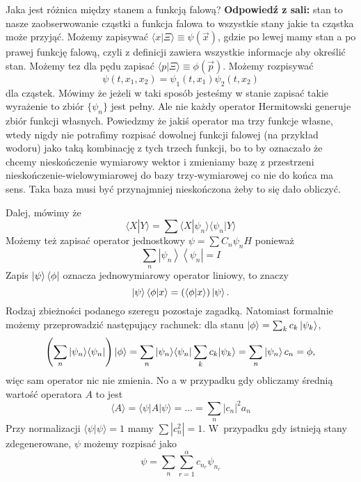 Jaka jest różnica między stanem a funkcją falową? \textbf{Odpowiedź z sali:} stan to nasze zaobserwowanie cząstki a funkcja falowa to wszystkie stany jakie ta cząstka może przyjąć. Możemy zapisywać $\langle x | \Xi \rangle \equiv \psi (\vec{x})$, gdzie po lewej mamy stan a po prawej funkcję falową, czyli z definicji zawiera wszystkie informacje aby określić stan. Możemy tez dla pędu zapisać $\langle p | \Xi \rangle \equiv \phi (\vec{p})$. Możemy rozpisywać $$ \psi(t, x_1, x_2) = \psi_1(t, x_1) \psi_2(t, x_2) $$ dla cząstek.
Mówimy że jeżeli w taki sposób jesteśmy w stanie zapisać takie wyrażenie to zbiór $\{\psi_n\}$ jest pełny. Ale nie każdy operator Hermitowski generuje zbiór funkcji własnych. Powiedzmy że jakiś operator ma trzy funkcje własne, wtedy nigdy nie potrafimy rozpisać dowolnej funkcji falowej (na przykład wodoru) jako taką kombinację z tych trzech funkcji, bo to by oznaczało że chcemy nieskończenie wymiarowy wektor i zmieniamy bazę z przestrzeni nieskończenie-wielowymiarowej do bazy trzy-wymiarowej co nie do końca ma sens. Taka baza musi być przynajmniej nieskończona żeby to się dało obliczyć.

Dalej, mówimy że 
\begin{equation*}
	\langle X | Y \rangle = \sum \langle X | \psi_n \rangle \langle \psi_n | Y \rangle
\end{equation*}
Możemy też zapisać operator jednostkowy $ \psi=\sum C_{n} \psi_{n} H $ ponieważ
\begin{equation*}
	\sum_{n}\left|\psi_{n}\right\rangle\left\langle\psi_{n}\right|=I 
\end{equation*}
Zapis $\ket{\psi}\bra{\phi}$ oznacza jednowymiarowy operator liniowy, to znaczy
\begin{equation*}
    \ket{\psi}\braket{\phi|x} = (\braket{\phi|x})\ket{\psi}.
\end{equation*}
Rodzaj zbieżności podanego szeregu pozostaje zagadką.
Natomiast formalnie możemy przeprowadzić następujący rachunek: dla
stanu $\ket{\phi} = \sum_k c_k \ket{\psi_k}$,
\begin{equation*}
    \left(\sum_{n} |\psi_{n} \rangle \langle \psi_{n} |\right) \ket{\phi} = 
	\sum_{n} |\psi_{n} \rangle \langle \psi_{n} | \sum_{k} c_{k} |\psi_{k} \rangle  =\sum_{n}\left|\psi_{n}\right\rangle c_{n}=\phi,
\end{equation*}
więc sam operator nic nie zmienia.
No a w przypadku gdy obliczamy średnią wartość operatora $A$ to jest 
\begin{equation*}
	\langle A\rangle=\langle\psi| A|\psi\rangle= \dotsc = \sum_{n}\left|c_{n}\right|^{2} a_{n}
\end{equation*}
Przy normalizacji $\langle \psi | \psi \rangle = 1$ mamy $\sum |c_n^2| = 1$.
W~przypadku gdy istnieją stany zdegenerowane, $\psi$ możemy rozpisać jako 
\begin{equation*}
	\psi = \sum_n \sum_{r=1}^{\alpha} c_{n_r} \psi_{n_r}
\end{equation*}

